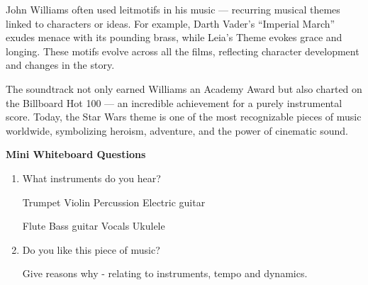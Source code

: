 \documentclass{article}
\begin{document}
\par\noindent John Williams often used leitmotifs in his music — recurring musical themes linked to characters or ideas. For example, Darth Vader’s “Imperial March” exudes menace with its pounding brass, while Leia’s Theme evokes grace and longing. These motifs evolve across all the films, reflecting character development and changes in the story.

\vspace{1em}


\par\noindent The soundtrack not only earned Williams an Academy Award but also charted on the Billboard Hot 100 — an incredible achievement for a purely instrumental score. Today, the Star Wars theme is one of the most recognizable pieces of music worldwide, symbolizing heroism, adventure, and the power of cinematic sound.

\par\noindent \vspace{3em}
\begin{tcolorbox}
\noindent\textbf{Mini Whiteboard Questions}
\vspace{1em}

\begin{enumerate}[leftmargin=1em, itemsep=0pt, parsep=0pt, topsep=0pt]
    \item What instruments do you hear?
    \vspace{1em}
    \begin{flushleft}
        Trumpet \hfill Violin \hfill Percussion \hfill Electric guitar    \end{flushleft}
    \vspace{1em}
        \begin{flushleft}
        Flute \hfill Bass guitar \hfill Vocals \hfill Ukulele    \end{flushleft}

        
    \vspace{1em}
    \item Do you like this piece of music?
    \vspace{1em}
    \par \noindent Give reasons why - relating to instruments, tempo and dynamics.
    

      
    \vspace{1em}
\end{enumerate}
\end{tcolorbox}


\newpage
\end{document}
